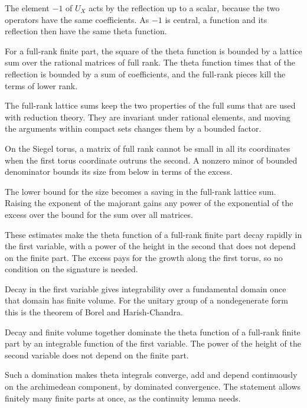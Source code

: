The element $-1$ of $U_X$ acts by the reflection up to a scalar, because the
two operators have the same coefficients. As $-1$ is central, a function and
its reflection then have the same theta function.

For a full-rank finite part, the square of the theta function is bounded by a
lattice sum over the rational matrices of full rank. The theta function times
that of the reflection is bounded by a sum of coefficients, and the full-rank
pieces kill the terms of lower rank.

The full-rank lattice sums keep the two properties of the full sums that are
used with reduction theory. They are invariant under rational elements, and
moving the arguments within compact sets changes them by a bounded factor.

On the Siegel torus, a matrix of full rank cannot be small in all its
coordinates when the first torus coordinate outruns the second. A nonzero
minor of bounded denominator bounds its size from below in terms of the excess.

The lower bound for the size becomes a saving in the full-rank lattice sum.
Raising the exponent of the majorant gains any power of the exponential of the
excess over the bound for the sum over all matrices.

These estimates make the theta function of a full-rank finite part decay
rapidly in the first variable, with a power of the height in the second that
does not depend on the finite part. The excess pays for the growth along the
first torus, so no condition on the signature is needed.

Decay in the first variable gives integrability over a fundamental domain once
that domain has finite volume. For the unitary group of a nondegenerate form
this is the theorem of Borel and Harish-Chandra.

Decay and finite volume together dominate the theta function of a full-rank
finite part by an integrable function of the first variable. The power of the
height of the second variable does not depend on the finite part.

Such a domination makes theta integrals converge, add and depend continuously
on the archimedean component, by dominated convergence. The statement allows
finitely many finite parts at once, as the continuity lemma needs.

